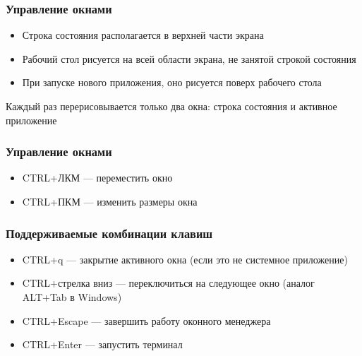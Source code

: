 \begin{frame}
\frametitle{Управление окнами}

\begin{itemize}
\item Строка состояния располагается в верхней части экрана
\item Рабочий стол рисуется на всей области экрана, не занятой строкой состояния
\item При запуске нового приложения, оно рисуется поверх рабочего стола
\end{itemize}

\begin{block}{}
\centering
Каждый раз перерисовывается только два окна: строка состояния и активное приложение
\end{block}

\end{frame}


\begin{frame}
\frametitle{Управление окнами}

\begin{itemize}
\item CTRL+ЛКМ --- переместить окно
\item CTRL+ПКМ --- изменить размеры окна
\end{itemize}

\end{frame}


\begin{frame}
\frametitle{Поддерживаемые комбинации клавиш}

\begin{itemize}
\item CTRL+q --- закрытие активного окна (если это не системное приложение)
\item CTRL+стрелка вниз --- переключиться на следующее окно (аналог ALT+Tab в Windows)
\item CTRL+Escape --- завершить работу оконного менеджера
\item CTRL+Enter --- запустить терминал
\end{itemize}

\end{frame}

